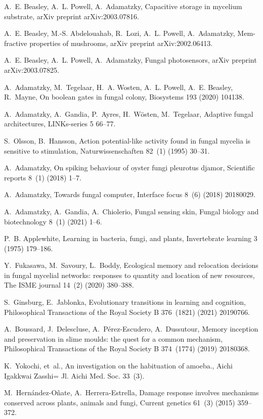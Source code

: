 \documentclass[]{elsarticle}
\begin{document}
\begin{thebibliography}{10}
A.~E. Beasley, A.~L. Powell, A.~Adamatzky, Capacitive storage in mycelium
  substrate, arXiv preprint arXiv:2003.07816.

A.~E. Beasley, M.-S. Abdelouahab, R.~Lozi, A.~L. Powell, A.~Adamatzky,
  Mem-fractive properties of mushrooms, arXiv preprint arXiv:2002.06413.

A.~E. Beasley, A.~L. Powell, A.~Adamatzky, Fungal photosensors, arXiv preprint
  arXiv:2003.07825.

A.~Adamatzky, M.~Tegelaar, H.~A. Wosten, A.~L. Powell, A.~E. Beasley, R.~Mayne,
  On boolean gates in fungal colony, Biosystems 193 (2020) 104138.

A.~Adamatzky, A.~Gandia, P.~Ayres, H.~W{\"o}sten, M.~Tegelaar, Adaptive fungal
  architectures, LINKs-series 5  66--77.

S.~Olsson, B.~Hansson, Action potential-like activity found in fungal mycelia
  is sensitive to stimulation, Naturwissenschaften 82~(1) (1995) 30--31.

A.~Adamatzky, On spiking behaviour of oyster fungi pleurotus djamor, Scientific
  reports 8~(1) (2018) 1--7.

A.~Adamatzky, Towards fungal computer, Interface focus 8~(6) (2018) 20180029.

A.~Adamatzky, A.~Gandia, A.~Chiolerio, Fungal sensing skin, Fungal biology and
  biotechnology 8~(1) (2021) 1--6.

P.~B. Applewhite, Learning in bacteria, fungi, and plants, Invertebrate
  learning 3 (1975) 179--186.

Y.~Fukasawa, M.~Savoury, L.~Boddy, Ecological memory and relocation decisions
  in fungal mycelial networks: responses to quantity and location of new
  resources, The ISME journal 14~(2) (2020) 380--388.

S.~Ginsburg, E.~Jablonka, Evolutionary transitions in learning and cognition,
  Philosophical Transactions of the Royal Society B 376~(1821) (2021) 20190766.

A.~Boussard, J.~Delescluse, A.~P{\'e}rez-Escudero, A.~Dussutour, Memory
  inception and preservation in slime moulds: the quest for a common mechanism,
  Philosophical Transactions of the Royal Society B 374~(1774) (2019) 20180368.

K.~Yokochi, et~al., An investigation on the habituation of amoeba., Aichi
  Igakkwai Zasshi= Jl. Aichi Med. Soc. 33~(3).

M.~Hern{\'a}ndez-O{\~n}ate, A.~Herrera-Estrella, Damage response involves
  mechanisms conserved across plants, animals and fungi, Current genetics
  61~(3) (2015) 359--372.

\end{thebibliography}
\end{document}
